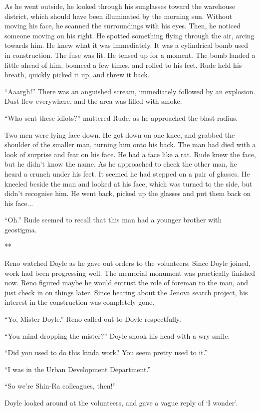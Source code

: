 \documentclass[oneside]{book}
\begin{document}
As he went outside, he looked through his sunglasses toward the warehouse district, which should have been illuminated by the morning sun. Without moving his face, he scanned the surroundings with his eyes. Then, he noticed someone moving on his right. He spotted something flying through the air, arcing towards him. He knew what it was immediately. It was a cylindrical bomb used in construction. The fuse was lit. He tensed up for a moment. The bomb landed a little ahead of him, bounced a few times, and rolled to his feet. Rude held his breath, quickly picked it up, and threw it back.

“Aaargh!” There was an anguished scream, immediately followed by an explosion. Dust flew everywhere, and the area was filled with smoke.

“Who sent these idiots?” muttered Rude, as he approached the blast radius.

Two men were lying face down. He got down on one knee, and grabbed the shoulder of the smaller man, turning him onto his back. The man had died with a look of surprise and fear on his face. He had a face like a rat. Rude knew the face, but he didn’t know the name. As he approached to check the other man, he heard a crunch under his feet. It seemed he had stepped on a pair of glasses. He kneeled beside the man and looked at his face, which was turned to the side, but didn’t recognise him. He went back, picked up the glasses and put them back on his face...

“Oh.” Rude seemed to recall that this man had a younger brother with geostigma.

**

Reno watched Doyle as he gave out orders to the volunteers. Since Doyle joined, work had been progressing well. The memorial monument was practically finished now. Reno figured maybe he would entrust the role of foreman to the man, and just check in on things later. Since hearing about the Jenova search project, his interest in the construction was completely gone.

“Yo, Mister Doyle.” Reno called out to Doyle respectfully.

“You mind dropping the mister?” Doyle shook his head with a wry smile.

“Did you used to do this kinda work? You seem pretty used to it.”

“I was in the Urban Development Department.”

“So we’re Shin-Ra colleagues, then!”

Doyle looked around at the volunteers, and gave a vague reply of ‘I wonder’.
\end{document}
